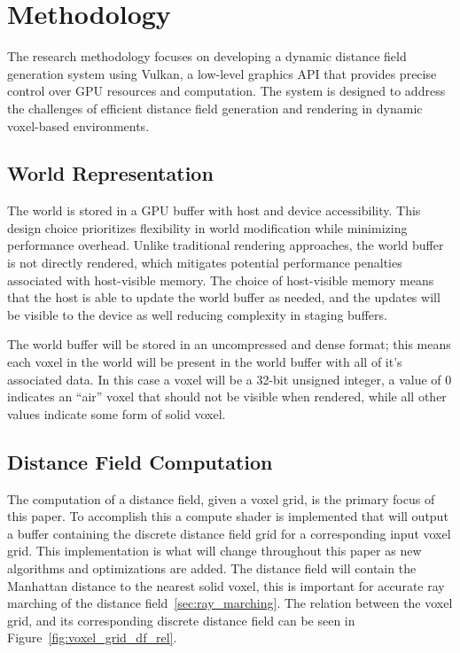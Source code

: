 \chapter{Methodology}
The research methodology focuses on developing a dynamic distance field generation system using Vulkan, a low-level
graphics API that provides precise control over GPU resources and computation. The system is designed to address the
challenges of efficient distance field generation and rendering in dynamic voxel-based environments.

\section{World Representation}
The world is stored in a GPU buffer with host and device accessibility. This design choice prioritizes flexibility in
world modification while minimizing performance overhead. Unlike traditional rendering approaches, the world buffer is
not directly rendered, which mitigates potential performance penalties associated with host-visible memory. The choice
of host-visible memory means that the host is able to update the world buffer as needed, and the updates will be visible
to the device as well reducing complexity in staging buffers.

The world buffer will be stored in an uncompressed and dense format; this means each voxel in the world will be
present in the world buffer with all of it's associated data. In this case a voxel will be a 32-bit unsigned integer, a
value of 0 indicates an ``air'' voxel that should not be visible when rendered, while all other values indicate some
form of solid voxel.

\section{Distance Field Computation} \label{sec:df_repr}
The computation of a distance field, given a voxel grid, is the primary focus of this paper. To accomplish this a
compute shader is implemented that will output a buffer containing the discrete distance field grid for a corresponding
input voxel grid. This implementation is what will change throughout this paper as new algorithms and optimizations are
added. The distance field will contain the Manhattan distance to the nearest solid voxel, this is important for accurate
ray marching of the distance field~\ref{sec:ray_marching}. The relation between the voxel grid, and its corresponding
discrete distance field can be seen in Figure~\ref{fig:voxel_grid_df_rel}.

